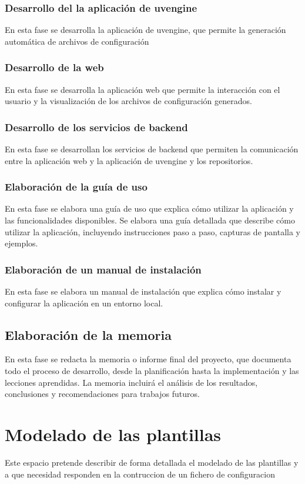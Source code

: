 \documentclass[12pt, a4paper, twoside]{article}
\begin{document}
\subsubsection{Desarrollo del la aplicación de uvengine }
En esta fase se desarrolla la aplicación de uvengine, que permite la generación automática de archivos de configuración
\subsubsection{Desarrollo de la web}
En esta fase se desarrolla la aplicación web que permite la interacción con el usuario y la visualización de los archivos de configuración generados.
\subsubsection{Desarrollo de los servicios de backend}
En esta fase se desarrollan los servicios de backend que permiten la comunicación entre la aplicación web y la aplicación de uvengine y los repositorios.
\subsubsection{Elaboración de la guía de uso}
En esta fase se elabora una guía de uso que explica cómo utilizar la aplicación y las funcionalidades disponibles.
Se elabora una guía detallada que describe cómo utilizar la aplicación, incluyendo instrucciones paso a paso, capturas 
de pantalla y ejemplos. 
\subsubsection{Elaboración de un manual de instalación}
En esta fase se elabora un manual de instalación que explica cómo instalar y configurar la aplicación en un entorno local.
\subsection{Elaboración de la memoria}
En esta fase se redacta la memoria o informe final del proyecto, que documenta todo el proceso de desarrollo, desde la 
planificación hasta la implementación y las lecciones aprendidas. La memoria incluirá el análisis de los resultados, 
conclusiones y recomendaciones para trabajos futuros. 

\section{Modelado de las plantillas}
Este espacio pretende describir de forma detallada el modelado de las plantillas y a que necesidad responden en la contruccion de un fichero de configuracion
\end{document}
